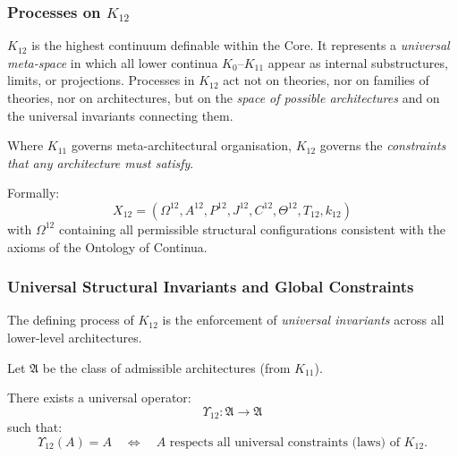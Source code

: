 

\subsubsection{Processes on $K_{12}$}
\label{sec:processes-k12}

$K_{12}$ is the highest continuum definable within the Core.  
It represents a \emph{universal meta-space} in which all lower continua
$K_0$--$K_{11}$ appear as internal substructures, limits, or projections.
Processes in $K_{12}$ act not on theories, nor on families of theories,
nor on architectures, but on the \emph{space of possible architectures}
and on the universal invariants connecting them.

Where $K_{11}$ governs meta-architectural organisation,  
$K_{12}$ governs the \emph{constraints that any architecture must satisfy}.

Formally:
\[
X_{12} = (\Omega^{12}, A^{12}, P^{12}, J^{12}, 
          C^{12}, \Theta^{12}, T_{12}, k_{12})
\]
with $\Omega^{12}$ containing all permissible structural configurations
consistent with the axioms of the Ontology of Continua.

\subsubsection{Universal Structural Invariants and Global Constraints}

The defining process of $K_{12}$ is the enforcement of
\emph{universal invariants} across all lower-level architectures.

Let $\mathfrak{A}$ be the class of admissible architectures 
(from $K_{11}$).

There exists a universal operator:
\[
\Upsilon_{12} : \mathfrak{A} \to \mathfrak{A}
\]
such that:
\[
\Upsilon_{12}(A) = A 
\quad \Longleftrightarrow \quad
A \text{ respects all universal constraints (laws) of } K_{12}.
\]

